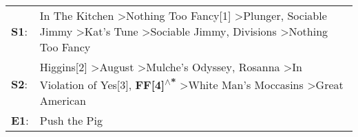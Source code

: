 \begin{supertabular}{p{0.03\textwidth}p{0.92\textwidth}}
 \textbf{S1}:  &                In The Kitchen\textsuperscript{} \textgreater \enspace Nothing Too Fancy[1]\textsuperscript{} \textgreater \enspace Plunger\textsuperscript{}, \enspace Sociable Jimmy\textsuperscript{} \textgreater \enspace Kat's Tune\textsuperscript{} \textgreater \enspace Sociable Jimmy\textsuperscript{}, \enspace Divisions\textsuperscript{} \textgreater \enspace Nothing Too Fancy\textsuperscript{}  \enspace  \\
 \textbf{S2}:  &  Higgins[2]\textsuperscript{} \textgreater \enspace August\textsuperscript{} \textgreater \enspace Mulche's Odyssey\textsuperscript{}, \enspace Rosanna\textsuperscript{} \textgreater \enspace In Violation of Yes[3]\textsuperscript{}, \enspace \textbf{FF[4]\textsuperscript{$\wedge$*}} \textgreater \enspace White Man's Moccasins\textsuperscript{} \textgreater \enspace Great American\textsuperscript{}  \enspace  \\
 \textbf{E1}:  &                                                                                                                                                                                                                                                                                                                                                                                    Push the Pig\textsuperscript{}  \enspace  \\
\end{supertabular}

